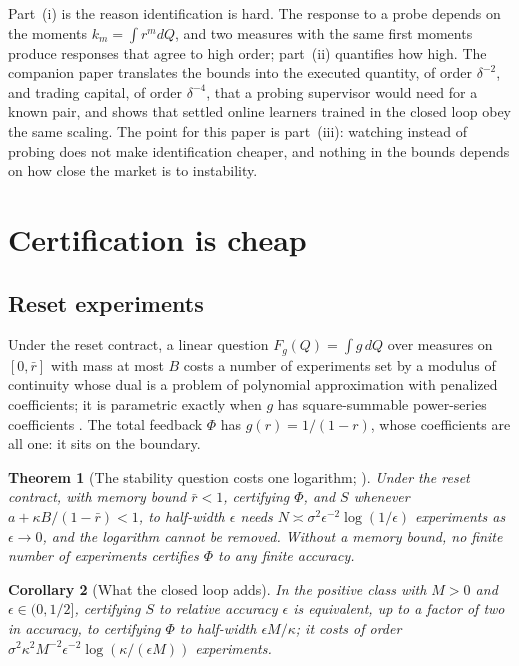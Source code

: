 \documentclass[12pt]{article}
\newtheorem{theorem}{Theorem}
\newtheorem{corollary}[theorem]{Corollary}
\theoremstyle{definition}
\theoremstyle{remark}
\begin{document}
Part~(i) is the reason identification is hard. The response to a probe depends on the moments $k_m=\int r^mdQ$, and two measures with the same first moments produce responses that agree to high order; part~(ii) quantifies how high. The companion paper translates the bounds into the executed quantity, of order $\delta^{-2}$, and trading capital, of order $\delta^{-4}$, that a probing supervisor would need for a known pair, and shows that settled online learners trained in the closed loop obey the same scaling. The point for this paper is part~(iii): watching instead of probing does not make identification cheaper, and nothing in the bounds depends on how close the market is to instability.

\section{Certification is cheap}\label{sec:certify}

\subsection{Reset experiments}

Under the reset contract, a linear question $F_g(Q)=\int g\,dQ$ over measures on $[0,\bar r]$ with mass at most $B$ costs a number of experiments set by a modulus of continuity whose dual is a problem of polynomial approximation with penalized coefficients; it is parametric exactly when $g$ has square-summable power-series coefficients \citep[Chapter~4]{niroula2026thesis}. The total feedback $\Phi$ has $g(r)=1/(1-r)$, whose coefficients are all one: it sits on the boundary.

\begin{theorem}[The stability question costs one logarithm; \citealp{niroula2026thesis}]\label{thm:philog}
Under the reset contract, with memory bound $\bar r<1$, certifying $\Phi$, and $S$ whenever $a+\kappa B/(1-\bar r)<1$, to half-width $\epsilon$ needs $N\asymp\sigma^2\epsilon^{-2}\log(1/\epsilon)$ experiments as $\epsilon\to0$, and the logarithm cannot be removed. Without a memory bound, no finite number of experiments certifies $\Phi$ to any finite accuracy.
\end{theorem}

\begin{corollary}[What the closed loop adds]\label{cor:loop}
In the positive class with $M>0$ and $\epsilon\in(0,1/2]$, certifying $S$ to relative accuracy $\epsilon$ is equivalent, up to a factor of two in accuracy, to certifying $\Phi$ to half-width $\epsilon M/\kappa$; it costs of order $\sigma^2\kappa^2M^{-2}\epsilon^{-2}\log(\kappa/(\epsilon M))$ experiments.
\end{corollary}
\end{document}
